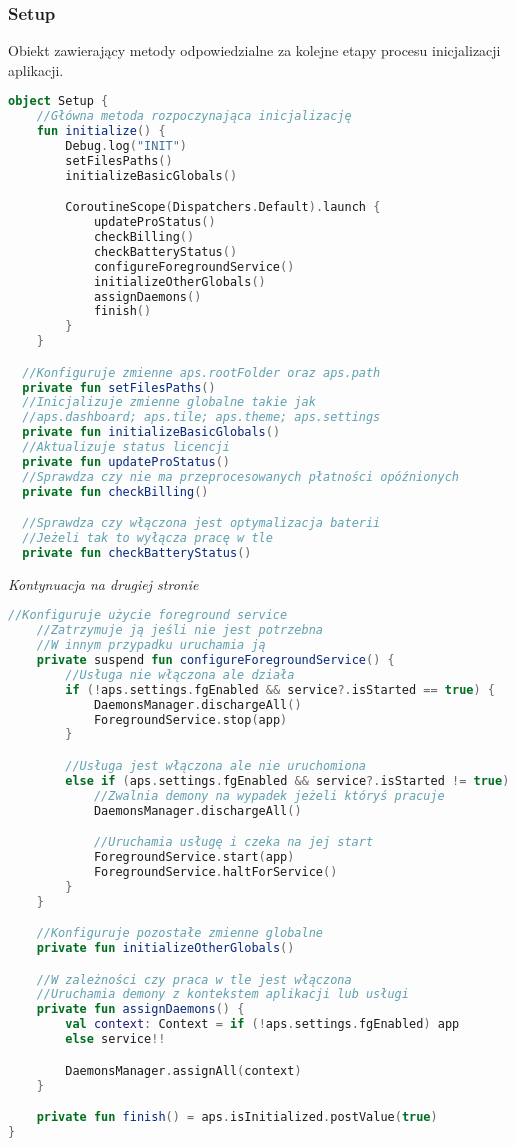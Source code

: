 \subsubsection{Setup}
Obiekt zawierający metody odpowiedzialne za kolejne etapy procesu inicjalizacji aplikacji.

\begin{lstlisting}[language=Kotlin]
object Setup {
    //Główna metoda rozpoczynająca inicjalizację
    fun initialize() {
        Debug.log("INIT")
        setFilesPaths()
        initializeBasicGlobals()

        CoroutineScope(Dispatchers.Default).launch {
            updateProStatus()
            checkBilling()
            checkBatteryStatus()
            configureForegroundService()
            initializeOtherGlobals()
            assignDaemons()
            finish()
        }
    }

  //Konfiguruje zmienne aps.rootFolder oraz aps.path
  private fun setFilesPaths()
  //Inicjalizuje zmienne globalne takie jak
  //aps.dashboard; aps.tile; aps.theme; aps.settings
  private fun initializeBasicGlobals()
  //Aktualizuje status licencji
  private fun updateProStatus()
  //Sprawdza czy nie ma przeprocesowanych płatności opóźnionych
  private fun checkBilling()

  //Sprawdza czy włączona jest optymalizacja baterii
  //Jeżeli tak to wyłącza pracę w tle
  private fun checkBatteryStatus()
\end{lstlisting}

\textit{Kontynuacja na drugiej stronie}

\newpage

\begin{lstlisting}[language=Kotlin]
    //Konfiguruje użycie foreground service
    //Zatrzymuje ją jeśli nie jest potrzebna
    //W innym przypadku uruchamia ją
    private suspend fun configureForegroundService() {
        //Usługa nie włączona ale działa
        if (!aps.settings.fgEnabled && service?.isStarted == true) {
            DaemonsManager.dischargeAll()
            ForegroundService.stop(app)
        }

        //Usługa jest włączona ale nie uruchomiona
        else if (aps.settings.fgEnabled && service?.isStarted != true) {
            //Zwalnia demony na wypadek jeżeli któryś pracuje
            DaemonsManager.dischargeAll()

            //Uruchamia usługę i czeka na jej start
            ForegroundService.start(app)
            ForegroundService.haltForService()
        }
    }

    //Konfiguruje pozostałe zmienne globalne
    private fun initializeOtherGlobals()

    //W zależności czy praca w tle jest włączona
    //Uruchamia demony z kontekstem aplikacji lub usługi
    private fun assignDaemons() {
        val context: Context = if (!aps.settings.fgEnabled) app
        else service!!

        DaemonsManager.assignAll(context)
    }

    private fun finish() = aps.isInitialized.postValue(true)
}
\end{lstlisting}

